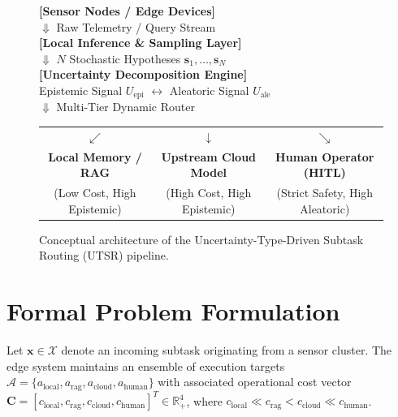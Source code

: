 \begin{figure}[ht]
    \centering
    \begin{tcolorbox}[colback=codeBackground, colframe=btuDarkGray, width=0.9\textwidth, arc=2mm, boxrule=0.5pt]
        \centering
        \vspace{0.5cm}
        \sffamily
        \textbf{[Sensor Nodes / Edge Devices]} \\
        $\Downarrow$ \small Raw Telemetry / Query Stream \\
        \textbf{[Local Inference \& Sampling Layer]} \\
        $\Downarrow$ \small $N$ Stochastic Hypotheses $\mathbf{s}_1, \dots, \mathbf{s}_N$ \\
        \textbf{[Uncertainty Decomposition Engine]} \\
        \small Epistemic Signal $U_{\text{epi}}$ \quad $\longleftrightarrow$ \quad Aleatoric Signal $U_{\text{ale}}$ \\
        $\Downarrow$ \small Multi-Tier Dynamic Router \\
        \begin{tabular}{ccc}
            $\swarrow$ & $\downarrow$ & $\searrow$ \\
            \textbf{Local Memory / RAG} & \textbf{Upstream Cloud Model} & \textbf{Human Operator (HITL)} \\
            \scriptsize (Low Cost, High Epistemic) & \scriptsize (High Cost, High Epistemic) & \scriptsize (Strict Safety, High Aleatoric)
        \end{tabular}
        \vspace{0.5cm}
    \end{tcolorbox}
    \caption{Conceptual architecture of the Uncertainty-Type-Driven Subtask Routing (UTSR) pipeline.}
    \label{fig:architecture_pipeline}
\end{figure}

\section{Formal Problem Formulation}
\label{sec:method_formulation}

Let $\mathbf{x} \in \mathcal{X}$ denote an incoming subtask originating from a sensor cluster. The edge system maintains an ensemble of execution targets $\mathcal{A} = \{a_{\text{local}}, a_{\text{rag}}, a_{\text{cloud}}, a_{\text{human}}\}$ with associated operational cost vector $\mathbf{C} = [c_{\text{local}}, c_{\text{rag}}, c_{\text{cloud}}, c_{\text{human}}]^T \in \mathbb{R}^4_+$, where $c_{\text{local}} \ll c_{\text{rag}} < c_{\text{cloud}} \ll c_{\text{human}}$.

